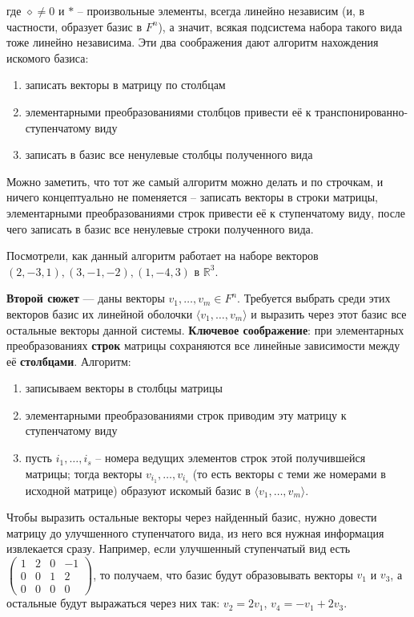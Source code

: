 \documentclass[10pt, a4paper]{extarticle}
\def \R{\mathbb{R}}
\theoremstyle{definition}
\begin{document}
где $\diamond \ne 0$ и $*$ -- произвольные элементы, всегда линейно независим (и, в частности, образует базис в $F^n$), а значит, 
всякая подсистема набора такого вида тоже линейно независима. Эти два соображения дают алгоритм нахождения искомого базиса:
\begin{enumerate}[noitemsep]
    \item записать векторы в матрицу по столбцам
    \item элементарными преобразованиями столбцов привести её к транспонированно-ступенчатому виду
    \item записать в базис все ненулевые столбцы полученного вида
\end{enumerate} 
Можно заметить, что тот же самый алгоритм можно делать и по строчкам, и ничего концептуально не поменяется -- 
записать векторы в строки матрицы, элементарными преобразованиями строк привести её к ступенчатому виду,
после чего записать в базис все ненулевые строки полученного вида. 

Посмотрели, как данный алгоритм работает на наборе векторов $(2,-3,1), (3,-1,-2), (1,-4,3)$ в $\R^3$.

\textbf{Второй сюжет} --- даны векторы $v_1,\dots, v_m \in F^n$.
Требуется выбрать среди этих векторов базис их линейной оболочки $\langle v_1,\dots, v_m \rangle$ и выразить через этот базис 
все остальные векторы данной системы. \textbf{Ключевое соображение}: при элементарных преобразованиях \textbf{строк} матрицы сохраняются 
все линейные зависимости между её \textbf{столбцами}. Алгоритм: 
\begin{enumerate}[noitemsep]
    \item записываем векторы в столбцы матрицы
    \item элементарными преобразованиями строк приводим эту матрицу к ступенчатому виду
    \item пусть $i_1,\dots, i_s$ -- номера ведущих элементов строк этой получившейся матрицы; тогда векторы $v_{i_1},\ldots, v_{i_s}$ 
    (то есть векторы с теми же номерами в исходной матрице) образуют искомый базис в $\langle v_1,\ldots, v_m \rangle$.
\end{enumerate}
Чтобы выразить остальные векторы через найденный базис, нужно довести матрицу до улучшенного ступенчатого вида, из него вся нужная 
информация извлекается сразу. Например, если улучшенный ступенчатый вид есть 
$\begin{pmatrix} 
    1 & 2 & 0 & -1 \\ 
    0 & 0 & 1 & 2 \\ 
    0 & 0 & 0 & 0
\end{pmatrix}$,
то получаем, что базис будут образовывать векторы $v_1$ и $v_3$, 
а остальные будут выражаться через них так: $v_2 = 2v_1$, $v_4 = -v_1 + 2v_3$.
\end{document}
